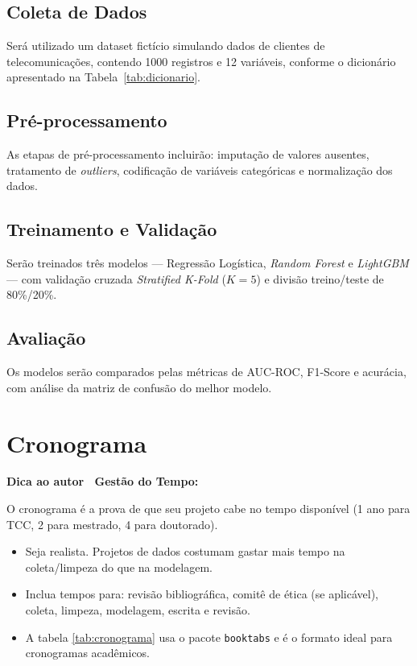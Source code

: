 \documentclass[
    article,
    12pt,
    oneside,
    a4paper,
    english,
    brazilian
    ]{abntex2}
\numberwithin{equation}{section}
\newenvironment{dica}{%
    \par\medskip
    \color{blue!60!black}\small\itshape
}{%
    \par\medskip
}
\begin{document}
\subsection{Coleta de Dados}

Será utilizado um dataset fictício simulando dados de clientes de telecomunicações, contendo \num{1000} registros e 12 variáveis, conforme o dicionário apresentado na Tabela~\ref{tab:dicionario}.



\subsection{Pré-processamento}

As etapas de pré-processamento incluirão: imputação de valores ausentes, tratamento de \textit{outliers}, codificação de variáveis categóricas e normalização dos dados.

\subsection{Treinamento e Validação}

Serão treinados três modelos --- Regressão Logística, \textit{Random Forest} e \textit{LightGBM} --- com validação cruzada \textit{Stratified K-Fold} ($K = 5$) e divisão treino/teste de 80\%/20\%.

\subsection{Avaliação}

Os modelos serão comparados pelas métricas de AUC-ROC, F1-Score e acurácia, com análise da matriz de confusão do melhor modelo.

\section{Cronograma}

\begin{dica}
\noindent\textbf{Dica ao autor \textemdash\ Gestão do Tempo:}

O cronograma é a prova de que seu projeto cabe no tempo disponível (1 ano para TCC, 2 para mestrado, 4 para doutorado).
\begin{itemize}
    \item Seja realista. Projetos de dados costumam gastar mais tempo na coleta/limpeza do que na modelagem.
    \item Inclua tempos para: revisão bibliográfica, comitê de ética (se aplicável), coleta, limpeza, modelagem, escrita e revisão.
    \item A tabela \ref{tab:cronograma} usa o pacote \texttt{booktabs} e é o formato ideal para cronogramas acadêmicos.
\end{itemize}
\end{dica}
\end{document}
